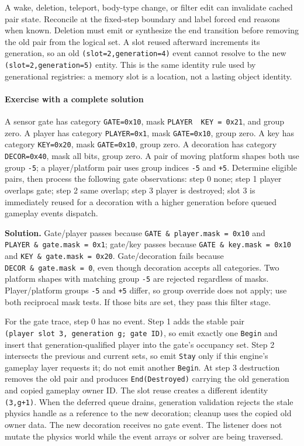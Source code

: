 A wake, deletion, teleport, body-type change, or filter edit can invalidate cached pair state. Reconcile at the fixed-step boundary and label forced end reasons when known. Deletion must emit or synthesize the end transition before removing the old pair from the logical set. A slot reused afterward increments its generation, so an old \texttt{(slot=2,generation=4)} event cannot resolve to the new \texttt{(slot=2,generation=5)} entity. This is the same identity rule used by generational registries: a memory slot is a location, not a lasting object identity.

\paragraph{Exercise with a complete solution}\label{exercise-with-a-complete-solution}

A sensor gate has category \texttt{GATE=0x10}, mask \texttt{PLAYER\ \textbar{}\ KEY\ =\ 0x21}, and group zero. A player has category \texttt{PLAYER=0x1}, mask \texttt{GATE=0x10}, group zero. A key has category \texttt{KEY=0x20}, mask \texttt{GATE=0x10}, group zero. A decoration has category \texttt{DECOR=0x40}, mask all bits, group zero. A pair of moving platform shapes both use group \texttt{-5}; a player/platform pair uses group indices \texttt{-5} and \texttt{+5}. Determine eligible pairs, then process the following gate observations: step 0 none; step 1 player overlaps gate; step 2 same overlap; step 3 player is destroyed; slot 3 is immediately reused for a decoration with a higher generation before queued gameplay events dispatch.

\textbf{Solution.} Gate/player passes because \texttt{GATE\ \&\ player.mask\ =\ 0x10} and \texttt{PLAYER\ \&\ gate.mask\ =\ 0x1}; gate/key passes because \texttt{GATE\ \&\ key.mask\ =\ 0x10} and \texttt{KEY\ \&\ gate.mask\ =\ 0x20}. Gate/decoration fails because \texttt{DECOR\ \&\ gate.mask\ =\ 0}, even though decoration accepts all categories. Two platform shapes with matching group \texttt{-5} are rejected regardless of masks. Player/platform groups \texttt{-5} and \texttt{+5} differ, so group override does not apply; use both reciprocal mask tests. If those bits are set, they pass this filter stage.

For the gate trace, step 0 has no event. Step 1 adds the stable pair \texttt{(player\ slot\ 3,\ generation\ g;\ gate\ ID)}, so emit exactly one \texttt{Begin} and insert that generation-qualified player into the gate's occupancy set. Step 2 intersects the previous and current sets, so emit \texttt{Stay} only if this engine's gameplay layer requests it; do not emit another \texttt{Begin}. At step 3 destruction removes the old pair and produces \texttt{End(Destroyed)} carrying the old generation and copied gameplay owner ID. The slot reuse creates a different identity \texttt{(3,g+1)}. When the deferred queue drains, generation validation rejects the stale physics handle as a reference to the new decoration; cleanup uses the copied old owner data. The new decoration receives no gate event. The listener does not mutate the physics world while the event arrays or solver are being traversed.

